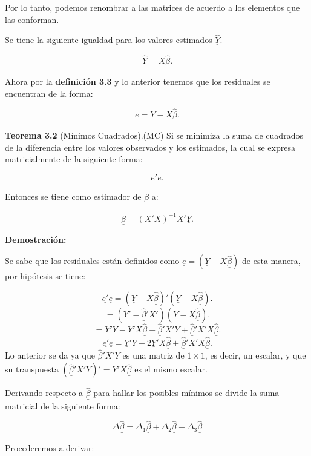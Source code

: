 \documentclass[
  a4paper,
  oneside,
  openany]{book}
\begin{document}
Por lo tanto, podemos renombrar a las matrices de acuerdo a los elementos que las conforman.

Se tiene la siguiente igualdad para los valores estimados \(\underline{\hat{Y}}.\)

\[\underline{\hat{Y}}=X \underline{\hat{\beta}}.\]

Ahora por la \textbf{definición 3.3} y lo anterior tenemos que los residuales se encuentran de la forma:

\[\underline{e}=\underline{Y}-X \underline{\hat{\beta}}.\]

\textbf{Teorema 3.2} (Mínimos Cuadrados).(MC) Si se minimiza la suma de cuadrados de la diferencia entre los valores observados y los estimados, la cual se expresa matricialmente de la siguiente forma:

\[\underline{e'}\underline{e}.\]

Entonces se tiene como estimador de \(\underline{\beta}\) a:

\[\underline{\hat{\beta}}=\left( X'X\right)^{-1}X'\underline{Y}.\]

\textbf{Demostración:}

Se sabe que los residuales están definidos como \(\underline{e}=\left( \underline{Y}-X \underline{\hat{\beta}}\right)\) de esta manera, por hipótesis se tiene:

\[\underline{e'}\underline{e}=\left( \underline{Y}-X \underline{\hat{\beta}}\right)'\left( \underline{Y}-X \underline{\hat{\beta}}\right).\]
\[=\left(\underline{Y}'- \underline{\hat{\beta}}'X'\right)\left( \underline{Y}-X \underline{\hat{\beta}}\right).\]
\[=\underline{Y}'Y-\underline{Y}'X\underline{\hat{\beta}}-\underline{\hat{\beta}}'X'\underline{Y}+\underline{\hat{\beta}}'X'X\underline{\hat{\beta}}.\]
\[\underline{e'}\underline{e}=\underline{Y}'Y-2\underline{Y}'X\underline{\hat{\beta}}+\underline{\hat{\beta}}'X'X\underline{\hat{\beta}}.\]
Lo anterior se da ya que \(\underline{\hat{\beta}}'X'\underline{Y}\) es una matriz de \(1\times 1\), es decir, un escalar, y que su transpuesta \((\underline{\hat{\beta}}'X'\underline{Y})'=\underline{Y}'X\underline{\hat{\beta}}\) es el mismo escalar.

Derivando respecto a \(\underline{\hat{\beta}}\) para hallar los posibles mínimos se divide la suma matricial de la siguiente forma:

\[\Delta \underline{\hat\beta}=\Delta_{1} \underline{\hat{\beta}}+\Delta_{2} \underline{\hat{\beta}}+\Delta_{3} \underline{\hat{\beta}}\]

Procederemos a derivar:
\end{document}
